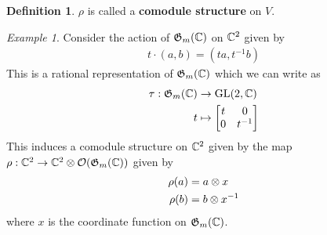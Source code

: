 \documentclass{amsart}
\numberwithin{equation}{section}
\theoremstyle{plain} %
\theoremstyle{definition}
\newtheorem{definition}[equation]{Definition}
\theoremstyle{remark}
\newtheorem{example}[equation]{Example}
\begin{document}
\begin{definition}
    $\rho$ is called a \textbf{comodule structure} on $V$.
\end{definition}

\begin{example}
    Consider the action of $\mathfrak{G}_m(\mathbb{C})$ on $\mathbb{C}^2$ given by
    \begin{align*}
        t\cdot (a,b) = (ta, t^{-1}b)
    \end{align*} This is a rational representation of $\mathfrak{G}_m(\mathbb{C})$ which we can write as 
    \begin{align*}
        \tau:\mathfrak{G}_m(\mathbb{C}) &\to \operatorname{GL}(2,\mathbb{C}) \\
        t &\mapsto \begin{bmatrix}
            t & 0 \\
            0 & {t}^{-1}
        \end{bmatrix}
    \end{align*} This induces a comodule structure on $\mathbb{C}^2$ given by the map $\rho: \mathbb{C}^2\to \mathbb{C}^2\otimes \mathcal{O}(\mathfrak{G}_m(\mathbb{C}))$ given by
    \begin{align*}
        \rho(a) &= a\otimes x \\
        \rho(b) &= b\otimes {x}^{-1}
    \end{align*} where $x$ is the coordinate function on $\mathfrak{G}_m(\mathbb{C})$.
\end{example}
\end{document}
